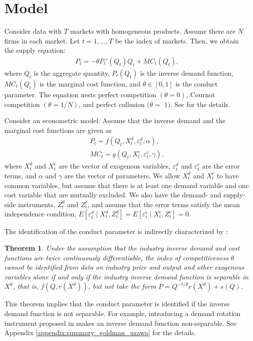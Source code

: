 \documentclass[11pt, a4paper]{article}
\newtheorem{theorem}{Theorem}
\theoremstyle{remark}
\begin{document}
\section{Model}
Consider data with $T$ markets with homogeneous products.
Assume there are $N$ firms in each market.
Let $t = 1,\ldots, T$ be the index of markets.
Then, we obtain the supply equation:
\begin{align}
     P_t = -\theta P_t'(Q_{t})Q_{t} + MC_t(Q_{t}),\label{eq:supply_equation}
\end{align}
where $Q_{t}$ is the aggregate quantity, $P_t(Q_{t})$ is the inverse demand function, $MC_{t}(Q_{t})$ is the marginal cost function, and $\theta\in[0,1]$ is the conduct parameter. 
The equation nests perfect competition $(\theta=0)$, Cournot competition $(\theta=1 / N)$, and perfect collusion $(\theta=$ $1)$. See \citet{bresnahan1982oligopoly} for the details.

Consider an econometric model.
Assume that the inverse demand and the marginal cost functions are given as
\begin{align*}
    P_t = f(Q_{t}, X^{d}_{t}, \varepsilon^{d}_{t}, \alpha), %
    \\
    MC_t = g(Q_{t}, X^{c}_{t}, \varepsilon^{c}_{t}, \gamma),%
\end{align*}
where $X^{d}_{t}$ and $X^{c}_{t}$ are the vector of exogenous variables, $\varepsilon^{d}_{t}$ and $\varepsilon^{c}_{t}$ are the error terms, and $\alpha$ and $\gamma$ are the vector of parameters.
We allow $X^{d}_{t}$ and $X^{c}_{t}$ to have common variables, but assume that there is at least one demand variable and one cost variable that are mutually excluded.
We also have the demand- and supply-side instruments, $Z^{d}_{t}$ and $Z^{c}_{t}$, and assume that the error terms satisfy the mean independence condition, $E[\varepsilon^{d}_{t}\mid X^{d}_{t}, Z^{d}_{t}] = E[\varepsilon^{c}_{t} \mid X^{c}_{t}, Z^{c}_{t}] =0$. 

The identification of the conduct parameter is indirectly characterized by \citet{lau1982identifying}:
\begin{theorem}\label{thm:lau_identification}
    Under the assumption that the industry inverse demand and cost functions are twice continuously differentiable, the index of competitiveness $\theta$ cannot be identified from data on industry price and output and other exogenous variables alone if and only if the industry inverse demand function is separable in $X^{d}$, that is, $f(Q, r(X^{d}))$, but not take the form $P = Q^{-1/\theta}r(X^{d}) + s(Q)$.
\end{theorem}
This theorem implies that the conduct parameter is identified if the inverse demand function is not separable.
For example, introducing a demand rotation instrument proposed in \citet{bresnahan1982oligopoly} makes an inverse demand function non-separable.
See Appendix \ref{appendix:summary_goldman_uzawa} for the details.
\end{document}
